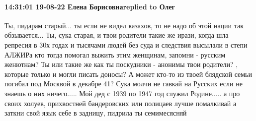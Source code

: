  
 
 
 
 

\paragraph{14:31:01 19-08-22 Елена Борисовнаreplied to Олег}

Ты, пидарам старый... ты если не видел казахов, то не надо об этой нации так обзывается... Ты, сука старая, и твои родители такие же ирази, когда шла репресия в 30х годах и тысячами людей без суда и следствия высылали в степи АЛЖИРа кто тогда помогал выжить этим женщинам, запомни - русским женютнам? Ты или такие же как ты поскудники - анонимы твои родители? , которые только и могли писать доносы? А может кто-то из твоей блядской семьи погибал под Москвой в декабре 41?
Сука молчи не гавкай на Русских если не знаешь о них ничего.....
Мой дед с 1939 по 1947 год служил Родине..... а про своих холуев, прихвостней бандеровских или полицаев лучше помалкивай а заткни свой язык себе в задницу, пидрила ты семимесясняй
